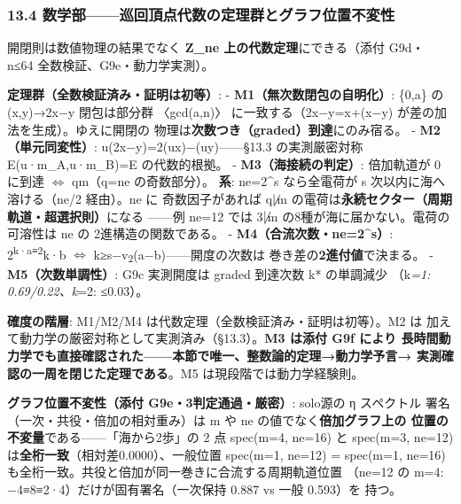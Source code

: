 \documentclass[
]{ltjarticle}
\begin{document}
\subsubsection{13.4
数学部------巡回頂点代数の定理群とグラフ位置不変性}\label{ux6570ux5b66ux90e8ux5de1ux56deux9802ux70b9ux4ee3ux6570ux306eux5b9aux7406ux7fa4ux3068ux30b0ux30e9ux30d5ux4f4dux7f6eux4e0dux5909ux6027}

開閉則は数値物理の結果でなく \textbf{Z\_ne 上の代数定理}にできる（添付
G9d・ n≤64 全数検証、G9e・動力学実測）。

\textbf{定理群（全数検証済み・証明は初等）}: -
\textbf{M1（無次数閉包の自明化）}: \{0,a\} の (x,y)→2x−y 閉包は部分群
〈gcd(a,n)〉 に一致する（2x−y=x+(x−y) が差の加法を生成）。ゆえに開閉の
物理は\textbf{次数つき（graded）到達}にのみ宿る。 -
\textbf{M2（単元同変性）}: u(2x−y)=2(ux)−(uy)------§13.3 の実測厳密対称
E(u·m\_A,u·m\_B)=E の代数的根拠。 - \textbf{M3（海接続の判定）}:
倍加軌道が 0 に到達 \(\Leftrightarrow\) q\textbar m（q=ne の奇数部分）。
\textbf{系}: ne=2\^{}s なら全電荷が s 次以内に海へ溶ける（ne/2
経由）。ne に 奇数因子があれば q\(\not\mid\)m
の電荷は\textbf{永続セクター（周期軌道・超選択則）}になる ------例 ne=12
では 3\(\not\mid\)m の8種が海に届かない。電荷の可溶性は ne の
2進構造の関数である。 - \textbf{M4（合流次数・ne=2\^{}s）}:
2\textsuperscript{k·a≡2}k·b \(\Leftrightarrow\)
k≥s−v\textsubscript{2}(a−b)------開度の次数は
巻き差の\textbf{2進付値}で決まる。 - \textbf{M5（次数単調性）}: G9c
実測開度は graded 到達次数 k* の単調減少 （k\emph{=1: 0.69/0.22、k}=2:
≤0.03）。

\textbf{確度の階層}: M1/M2/M4 は代数定理（全数検証済み・証明は初等）。M2
は 加えて動力学の厳密対称として実測済み（§13.3）。\textbf{M3 は添付 G9f
により
長時間動力学でも直接確認された------本節で唯一、整数論的定理→動力学予言→
実測確認の一周を閉じた定理である}。M5 は現段階では動力学経験則。

\textbf{グラフ位置不変性（添付 G9e・3判定通過・厳密）}: solo源の η
スペクトル 署名（一次・共役・倍加の相対重み）は m や ne
の値でなく\textbf{倍加グラフ上の
位置の不変量}である------「海から2歩」の 2 点 spec(m=4, ne=16) と
spec(m=3, ne=12) は\textbf{全桁一致}（相対差0.0000）、一般位置 spec(m=1,
ne=12) = spec(m=1, ne=16)
も全桁一致。共役と倍加が同一巻きに合流する周期軌道位置 （ne=12 の m=4:
−4≡8≡2·4）だけが固有署名（一次保持 0.887 vs 一般 0.593）を 持つ。
\end{document}
